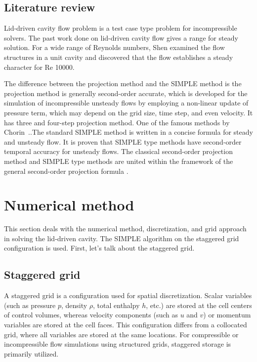 \documentclass{article}
\numberwithin{equation}{section}
\numberwithin{figure}{section}
\begin{document}
\subsection{Literature review}
Lid-driven cavity flow problem is a test case type problem for 
incompressible solvers. The past work done on lid-driven cavity 
flow gives a range for steady solution. For a wide range of 
Reynolds numbers, Shen \cite{shen1991hopf} examined the flow structures in a 
unit cavity and discovered that the flow establishes a steady 
character for Re 10000.

The difference between the projection method and the SIMPLE method 
is the projection method is generally second-order accurate, which 
is developed for the simulation of incompressible unsteady flows 
by employing a non-linear update of pressure term, which may depend 
on the grid size, time step, and even velocity. It has three and 
four-step projection method. One of the famous methods by 
Chorin~.\cite{chorin1997numerical}.The standard SIMPLE method is written 
in a concise formula for steady and unsteady flow. It is proven that SIMPLE 
type methods have second-order temporal accuracy for unsteady flows. The 
classical second-order projection method and SIMPLE type methods are 
united within the framework of the general second-order projection formula \cite{ni2007bridge}. 


\section{Numerical method}
This section deals with the numerical method, discretization, and grid approach in solving 
the lid-driven cavity. The SIMPLE algorithm on the staggered grid configuration 
is used. First, let’s talk about the staggered grid. 
\subsection{Staggered grid}
A staggered grid is a configuration used for spatial discretization. Scalar 
variables (such as pressure \( p \), density \( \rho \), total enthalpy \( h \), etc.) 
are stored at the cell centers of control volumes, whereas velocity components (such as 
\( u \) and \( v \)) or momentum variables are stored at the cell faces. This configuration 
differs from a collocated grid, where all variables are stored at the same locations. For 
compressible or incompressible flow simulations using structured grids, staggered storage is primarily utilized.
\end{document}
